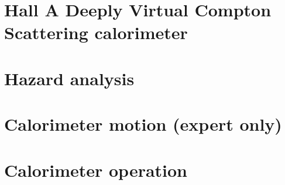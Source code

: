 \documentclass{article}
\begin{document}
\section{Hall A Deeply Virtual Compton Scattering calorimeter}

\section{Hazard analysis}

\section{Calorimeter motion (expert only)}

\section{Calorimeter operation}
\end{document}
